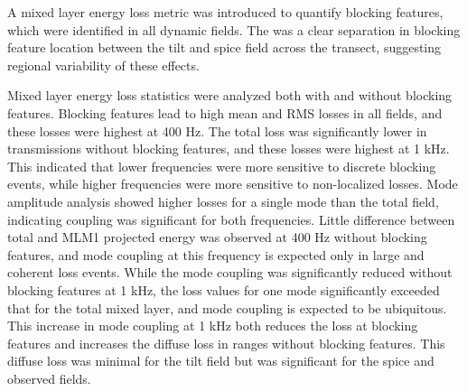 \documentclass[preprint,NumberedRefs]{JASA}
\begin{document}
A mixed layer energy loss metric was introduced to quantify blocking features, which were identified in all dynamic fields. The was a clear separation in blocking feature location between the tilt and spice field across the transect, suggesting regional variability of these effects.

Mixed layer energy loss statistics were analyzed both with and without blocking features. Blocking features lead to high mean and RMS losses in all fields, and these losses were highest at 400 Hz. The total loss was significantly lower in transmissions without blocking features, and these losses were highest at 1 kHz. This indicated that lower frequencies were more sensitive to discrete blocking events, while higher frequencies were more sensitive to non-localized losses. Mode amplitude analysis showed higher losses for a single mode than the total field, indicating coupling was significant for both frequencies. Little difference between total and MLM1 projected energy was observed at 400 Hz without blocking features, and mode coupling at this frequency is expected only in large and coherent loss events. While the mode coupling was significantly reduced without blocking features at 1 kHz, the loss values for one mode significantly exceeded that for the total mixed layer, and mode coupling is expected to be ubiquitous. This increase in mode coupling at 1 kHz both reduces the loss at blocking features and increases the diffuse loss in ranges without blocking features. This diffuse loss was minimal for the tilt field but was significant for the spice and observed fields.


\end{document}
